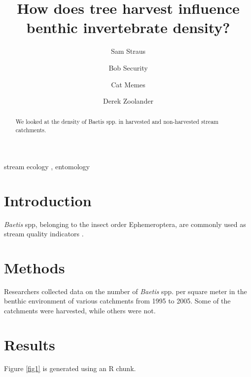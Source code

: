 \documentclass[preprint, 3p,
authoryear]{elsarticle} %
\begin{document}
\begin{frontmatter}

  \title{How does tree harvest influence benthic invertebrate density?}
    \author[McGill University]{Sam Straus%
  }
    \author[Another University]{Bob Security}
    \author[Another University]{Cat Memes%
  }
    \author[Some Institute of Technology]{Derek Zoolander%
  }
  
  \begin{abstract}
  We looked at the density of Baetis spp. in harvested and non-harvested
  stream catchments.
  \end{abstract}
    \begin{keyword}
    stream ecology \sep 
    entomology
  \end{keyword}
  
 \end{frontmatter}

\hypertarget{introduction}{%
\section{Introduction}\label{introduction}}

\emph{Baetis} spp, belonging to the insect order Ephemeroptera, are
commonly used as stream quality indicators \citep{wallace1986response}.

\hypertarget{methods}{%
\section{Methods}\label{methods}}

Researchers collected data on the number of \emph{Baetis} spp. per
square meter in the benthic environment of various catchments from 1995
to 2005. Some of the catchments were harvested, while others were not.

\hypertarget{results}{%
\section{Results}\label{results}}

Figure \ref{fig1} is generated using an R chunk.
\end{document}
